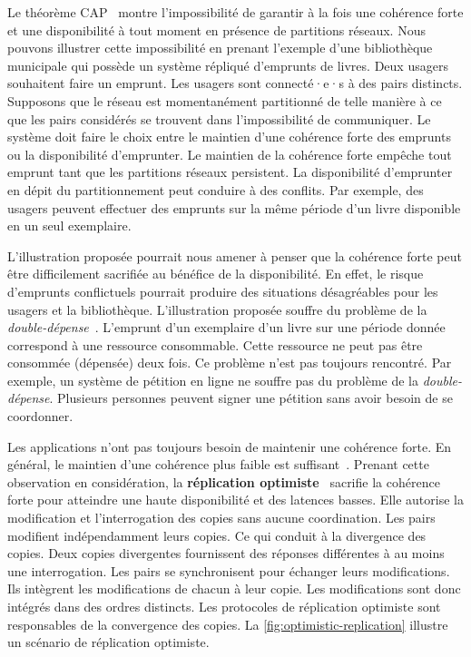 Le théorème CAP~\cite{brewer_cap_2000,gilbert_cap_2002} montre l'impossibilité de garantir à la fois une cohérence forte et une disponibilité à tout moment en présence de partitions réseaux.
Nous pouvons illustrer cette impossibilité en prenant l'exemple d'une bibliothèque municipale qui possède un système répliqué d'emprunts de livres.
Deux usagers souhaitent faire un emprunt.
Les usagers sont connecté·e·s à des pairs distincts.
Supposons que le réseau est momentanément partitionné de telle manière à ce que les pairs considérés se trouvent dans l'impossibilité de communiquer.
Le système doit faire le choix entre le maintien d'une cohérence forte des emprunts ou la disponibilité d'emprunter.
Le maintien de la cohérence forte empêche tout emprunt tant que les partitions réseaux persistent.
La disponibilité d'emprunter en dépit du partitionnement peut conduire à des conflits.
Par exemple, des usagers peuvent effectuer des emprunts sur la même période d'un livre disponible en un seul exemplaire.

L'illustration proposée pourrait nous amener à penser que la cohérence forte peut être difficilement sacrifiée au bénéfice de la disponibilité.
En effet, le risque d'emprunts conflictuels pourrait produire des situations désagréables pour les usagers et la bibliothèque.
L'illustration proposée souffre du problème de la \emph{double-dépense}~\cite{chohan_doublespending_2017}.
L'emprunt d'un exemplaire d'un livre sur une période donnée correspond à une ressource consommable.
Cette ressource ne peut pas être consommée (dépensée) deux fois.
Ce problème n'est pas toujours rencontré.
Par exemple, un système de pétition en ligne ne souffre pas du problème de la \emph{double-dépense}.
Plusieurs personnes peuvent signer une pétition sans avoir besoin de se coordonner.

Les applications n'ont pas toujours besoin de maintenir une cohérence forte.
En général, le maintien d'une cohérence plus faible est suffisant~\autocite{terry_baseball_2013, hellerstein_calm_2019, decandia_dynamo_2007}.
Prenant cette observation en considération, la \textbf{réplication optimiste}~\autocite{saito_2005_optimisticreplication} sacrifie la cohérence forte pour atteindre une haute disponibilité et des latences basses.
Elle autorise la modification et l'interrogation des copies sans aucune coordination.
Les pairs modifient indépendamment leurs copies.
Ce qui conduit à la divergence des copies.
Deux copies divergentes fournissent des réponses différentes à au moins une interrogation.
Les pairs se synchronisent pour échanger leurs modifications.
Ils intègrent les modifications de chacun à leur copie.
Les modifications sont donc intégrés dans des ordres distincts.
Les protocoles de réplication optimiste sont responsables de la convergence des copies.
La \autoref{fig:optimistic-replication} illustre un scénario de réplication optimiste.

